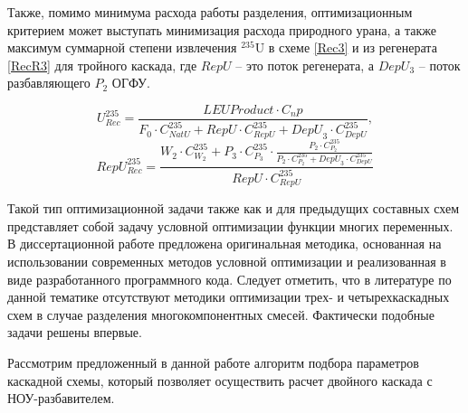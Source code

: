 Также, помимо минимума расхода работы разделения, оптимизационным критерием может выступать минимизация расхода природного урана, а также максимум суммарной степени извлечения $^{235}$U в схеме \ref{Rec3} и из регенерата \ref{RecR3} для тройного каскада, где $RepU$ -- это поток регенерата, а $DepU_{3}$ -- поток разбавляющего $P_2$ ОГФУ.

\begin{equation} \label{Rec3} 
    U^{235}_{Rec} = \frac{LEU Product \cdot C_np}{F_0 \cdot C_{NatU}^{235} + RepU \cdot C_{RepU}^{235} + {DepU}_3 \cdot C_{DepU}^{235}},
\end{equation} 
\begin{equation} \label{RecR3} 
    RepU^{235}_{Rec} = \frac{W_2\cdot C_{W_2}^{235}+P_3\cdot C_{P_3}^{235}\cdot \frac{P_2\cdot C_{P_2}^{235}}{P_2\cdot C_{P_2}^{235}+ {DepU}_3 \cdot C_{DepU}^{235}}}{RepU \cdot C_{RepU}^{235}}        
\end{equation} 

Такой тип оптимизационной задачи также как и для предыдущих составных схем представляет собой задачу условной оптимизации функции многих переменных. В диссертационной работе предложена оригинальная методика, основанная на использовании современных методов условной оптимизации и реализованная в виде разработанного программного кода.
Следует отметить, что в литературе по данной тематике отсутствуют методики оптимизации трех- и четырехкаскадных схем в случае разделения многокомпонентных смесей. Фактически подобные задачи решены впервые.

Рассмотрим предложенный в данной работе алгоритм подбора параметров каскадной схемы, который позволяет осуществить расчет двойного каскада с НОУ-разбавителем.

